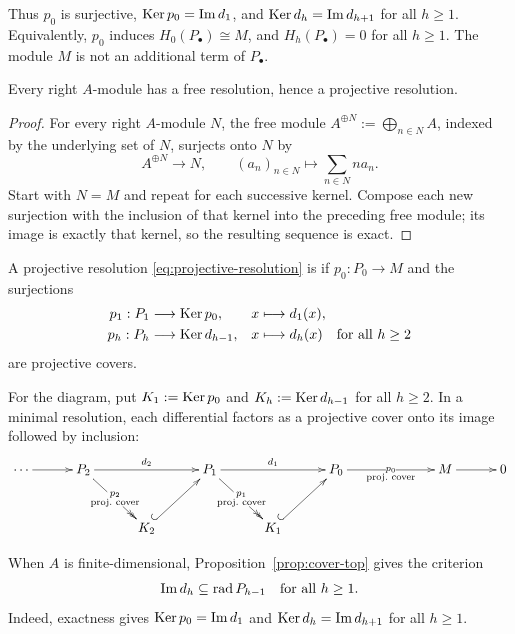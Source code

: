 Thus $p_0$ is surjective, $\operatorname{Ker}\nolimits p_0=\operatorname{Im}\nolimits d_1$, and $\operatorname{Ker}\nolimits d_h=\operatorname{Im}\nolimits d_{h+1}$ for all $h\geq1$.
Equivalently, $p_0$ induces $H_0(P_\bullet)\cong M$, and $H_h(P_\bullet)=0$ for all $h\geq1$.
The module $M$ is not an additional term of $P_\bullet$.

\begin{proposition}\label{prop:resolutions-exist}
Every right $A$-module has a free resolution, hence a projective resolution.
\end{proposition}

\begin{proof}
For every right $A$-module $N$, the free module $A^{\oplus N}:=\bigoplus_{n\in N}A$, indexed by the underlying set of $N$, surjects onto $N$ by
\[
A^{\oplus N}\longrightarrow N,\qquad
(a_n)_{n\in N}\longmapsto\sum_{n\in N}na_n.
\]
Start with $N=M$ and repeat for each successive kernel.
Compose each new surjection with the inclusion of that kernel into the preceding free module; its image is exactly that kernel, so the resulting sequence is exact.
\end{proof}

\begin{definition}\label{def:ordinary-minimal-resolution}
A projective resolution \eqref{eq:projective-resolution} is  if $p_0:P_0\to M$ and the surjections
\[
\begin{aligned}
p_1:P_1&\longrightarrow\operatorname{Ker}\nolimits p_0,& x&\longmapsto d_1(x),\\
p_h:P_h&\longrightarrow\operatorname{Ker}\nolimits d_{h-1},& x&\longmapsto d_h(x)
\quad\text{for all }h\geq2
\end{aligned}
\]
are projective covers.
\end{definition}

For the diagram, put $K_1:=\operatorname{Ker}\nolimits p_0$ and $K_h:=\operatorname{Ker}\nolimits d_{h-1}$ for all $h\geq2$.
In a minimal resolution, each differential factors as a projective cover onto its image followed by inclusion:
\[
\xymatrix@C=30pt@R=30pt{
\cdots\ar[r] & P_2\ar[rr]^{d_2}\ar@{->>}[dr]|{\substack{p_2\\\text{proj.\ cover}}}
& & P_1\ar[rr]^{d_1}\ar@{->>}[dr]|{\substack{p_1\\\text{proj.\ cover}}}
& & P_0\ar[rr]|{p_0}_{\text{proj.\ cover}} && M\ar[r] & 0\\
& & K_2\ar@{^{(}->}[ur] && K_1\ar@{^{(}->}[ur]
}
\]

When $A$ is finite-dimensional, Proposition~\ref{prop:cover-top} gives the criterion
\begin{equation}\label{eq:ordinary-minimal-criterion}
\operatorname{Im}\nolimits d_h\subseteq \operatorname{rad}\nolimits P_{h-1}\quad\text{for all }h\geq1.
\end{equation}
Indeed, exactness gives $\operatorname{Ker}\nolimits p_0=\operatorname{Im}\nolimits d_1$ and $\operatorname{Ker}\nolimits d_h=\operatorname{Im}\nolimits d_{h+1}$ for all $h\geq1$.

